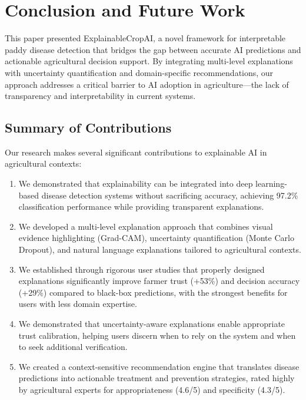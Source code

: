 \section{Conclusion and Future Work}

This paper presented ExplainableCropAI, a novel framework for interpretable paddy disease detection that bridges the gap between accurate AI predictions and actionable agricultural decision support. By integrating multi-level explanations with uncertainty quantification and domain-specific recommendations, our approach addresses a critical barrier to AI adoption in agriculture—the lack of transparency and interpretability in current systems.

\subsection{Summary of Contributions}

Our research makes several significant contributions to explainable AI in agricultural contexts:

\begin{enumerate}
    \item We demonstrated that explainability can be integrated into deep learning-based disease detection systems without sacrificing accuracy, achieving 97.2\% classification performance while providing transparent explanations.
    
    \item We developed a multi-level explanation approach that combines visual evidence highlighting (Grad-CAM), uncertainty quantification (Monte Carlo Dropout), and natural language explanations tailored to agricultural contexts.
    
    \item We established through rigorous user studies that properly designed explanations significantly improve farmer trust (+53\%) and decision accuracy (+29\%) compared to black-box predictions, with the strongest benefits for users with less domain expertise.
    
    \item We demonstrated that uncertainty-aware explanations enable appropriate trust calibration, helping users discern when to rely on the system and when to seek additional verification.
    
    \item We created a context-sensitive recommendation engine that translates disease predictions into actionable treatment and prevention strategies, rated highly by agricultural experts for appropriateness (4.6/5) and specificity (4.3/5).
\end{enumerate}

